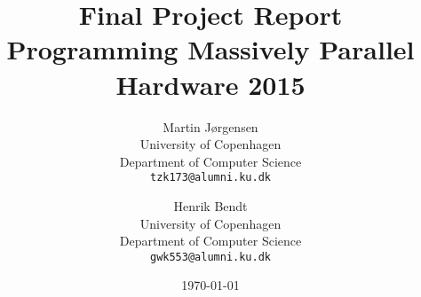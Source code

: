 \documentclass[a4paper,11pt]{article}
\title{\textbf{Final Project Report\\ Programming Massively Parallel Hardware 2015}}
\author
{
    Martin Jørgensen \\
    University of Copenhagen \\
    Department of Computer Science \\
    {\tt tzk173@alumni.ku.dk}
    \and
    Henrik Bendt \\
    University of Copenhagen \\
    Department of Computer Science \\
    {\tt gwk553@alumni.ku.dk}
}
\date{\today}
\begin{document}
\maketitle

\tableofcontents
\pagebreak










\end{document}
